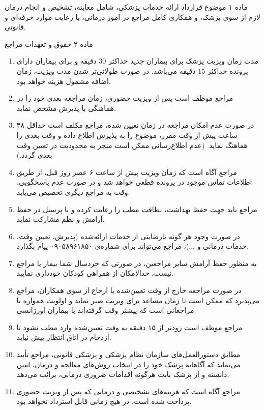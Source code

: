 \documentclass[12pt]{article}
\begin{document}
\vspace{0.5cm}
\large \XBZarBd
ماده ۱ موضوع قرارداد
\normalsize \normalfont
ارائه خدمات پزشکی، شامل معاینه، تشخیص و انجام درمان لازم از سوی پزشک، و همکاری کامل مراجع در امور درمانی، با رعایت موارد حرفه‌ای و قانونی.

\vspace{0.5cm}
\large \XBZarBd

ماده ۲ حقوق و تعهدات مراجع
\normalsize \normalfont

\begin{enumerate}
\item
مدت زمان ویزیت پزشک برای بیماران جدید حداکثر 30 دقیقه و برای بیماران دارای پرونده حداکثر 15 دقیقه می‌باشد. در صورت طولانی‌تر شدن مدت ویزیت، زمان اضافه مشمول هزینه خواهد بود.
\item
مراجع موظف است پس از ویزیت حضوری، زمان مراجعه بعدی خود را در هماهنگی با پذیرش مشخص نماید.
\item
در صورت عدم امکان مراجعه در زمان تعیین شده، مراجع مکلف است حداقل ۴۸ ساعت پیش از وقت مقرر، موضوع را به پذیرش اطلاع داده و وقت بعدی را هماهنگ نماید. (عدم اطلاع‌رسانی ممکن است منجر به محدودیت در تعیین وقت بعدی گردد.)
\item
مراجع آگاه است که زمان ویزیت پیش از ساعت ۶ عصر روز قبل، از طریق اطلاعات تماس موجود در پرونده قطعی خواهد شد و در صورت عدم پاسخگویی، وقت به مراجع دیگری تخصیص می‌یابد.
\item
مراجع باید جهت حفظ بهداشت، نظافت مطب را رعایت کرده و با پرسنل در حفظ آرامش و نظم مشارکت نماید.
\item
در صورت وجود هر گونه نارضایتی از خدمات ارائه‌شده (پذیرش، تعیین وقت، خدمات درمانی و ...)، مراجع می‌تواند برای شماره‌ی ۰۹۰۵۸۹۶۱۸۵۰ پیام بگذارد.
\item
به منظور حفظ آرامش سایر مراجعین، در صورتی که خردسال شما بیمار یا مراجع نیست، حدالامکان از همراهی کودکان خودداری نمایید.
\item
در صورت مراجعه خارج از وقت تعیین‌شده یا ارجاع از سوی همکاران، مراجع می‌پذیرد که ممکن است تا زمان مساعد برای ویزیت صبر نماید و اولویت همواره با مراجعانی است که پیشتر وقت گرفته‌اند یا بیماران اورژانسی.
\item
مراجع موظف است زودتر از ۱۵ دقیقه به وقت تعیین‌شده وارد مطب نشود تا ازدحام در اتاق انتظار پیش نیاید.
\item
مطابق دستورالعمل‌های سازمان نظام پزشکی و پزشکی قانونی، مراجع تأیید می‌نماید که آگاهانه پزشک خود را در انتخاب روش‌های معالجه و درمان، امین دانسته و از پزشک بابت هرگونه اقدامات ضروری درمانی، برائت می‌دهد.
\item
مراجع آگاه است که هزینه‌های تشخیصی و درمانی که پس از ویزیت حضوری پرداخت شده است، در هیچ زمانی قابل استرداد نخواهد بود.

\end{enumerate}
\end{document}
